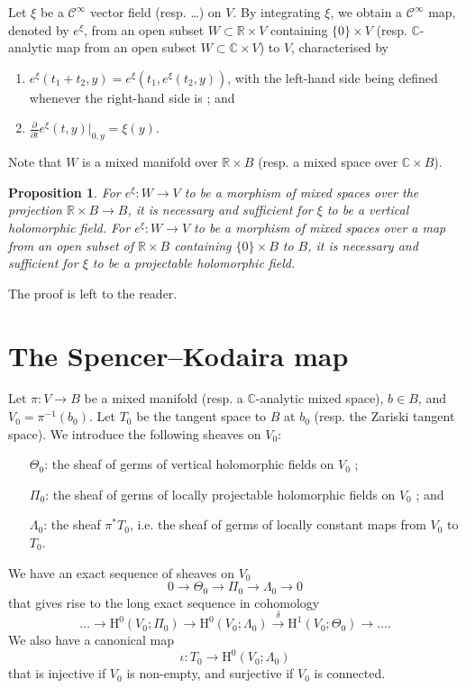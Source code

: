 \documentclass{article}
\theoremstyle{plain}
\newtheorem*{proposition*}{Proposition}
\theoremstyle{definition}
\newcommand{\RR}{\mathbb{R}}
\newcommand{\CC}{\mathbb{C}}
\newcommand{\HH}{\mathrm{H}}
\newcommand{\oldpage}[1]{\marginpar{\footnotesize$\Big\vert$ \textit{p.~#1}}}
\begin{document}
\oldpage{2-06}
Let $\xi$ be a $\mathscr{C}^\infty$ vector field (resp. \ldots) on $V$.
By integrating $\xi$, we obtain a $\mathscr{C}^\infty$ map, denoted by $e^\xi$, from an open subset $W\subset\RR\times V$ containing $\{0\}\times V$ (resp. $\CC$-analytic map from an open subset $W\subset\CC\times V$) to $V$, characterised by
\begin{enumerate}[(1)]
  \item $e^\xi(t_1+t_2,y) = e^\xi(t_1,e^\xi(t_2,y))$, with the left-hand side being defined whenever the right-hand side is ; and
  \item $\frac{\partial}{\partial t}e^\xi(t,y)|_{0,y} = \xi(y)$.
\end{enumerate}
Note that $W$ is a mixed manifold over $\RR\times B$ (resp. a mixed space over $\CC\times B$).

\begin{proposition*}
  For $e^\xi\colon W\to V$ to be a morphism of mixed spaces over the projection $\RR\times B\to B$, it is necessary and sufficient for $\xi$ to be a vertical holomorphic field.
  For $e^\xi\colon W\to V$ to be a morphism of mixed spaces over a map from an open subset of $\RR\times B$ containing $\{0\}\times B$ to $B$, it is necessary and sufficient for $\xi$ to be a projectable holomorphic field.
\end{proposition*}

The proof is left to the reader.


\section{The Spencer--Kodaira map}
\label{IV}

Let $\pi\colon V\to B$ be a mixed manifold (resp. a $\CC$-analytic mixed space), $b\in B$, and $V_0=\pi^{-1}(b_0)$.
Let $T_0$ be the tangent space to $B$ at $b_0$ (resp. the Zariski tangent space).
We introduce the following sheaves on $V_0$:
\begin{itemize}
  \item[$\Theta_0$:] the sheaf of germs of vertical holomorphic fields on $V_0$ ;
  \item[$\Pi_0$:] the sheaf of germs of locally projectable holomorphic fields on $V_0$ ; and
  \item[$\Lambda_0$:] the sheaf $\pi^*T_0$, i.e. the sheaf of germs of locally constant maps from $V_0$ to $T_0$.
\end{itemize}

We have an exact sequence of sheaves on $V_0$
\[
  0 \to \Theta_0 \to \Pi_0 \to \Lambda_0 \to 0
\]
that gives rise to the long exact sequence in cohomology
\[
  \ldots \to \HH^0(V_0;\Pi_0) \to \HH^0(V_0;\Lambda_0) \xrightarrow{\delta} \HH^1(V_0;\Theta_0) \to \ldots.
\]
We also have a canonical map
\oldpage{2-07}
\[
  \iota\colon T_0 \to \HH^0(V_0;\Lambda_0)
\]
that is injective if $V_0$ is non-empty, and surjective if $V_0$ is connected.
\end{document}
